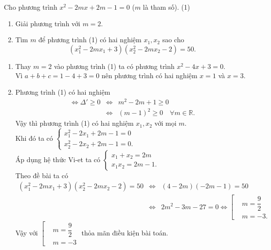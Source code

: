 \begin{ex}%
 Cho phương trình $x^2-2mx+2m-1=0$ ($m$ là tham số). \hfill (1)
	\begin{enumerate}
		\item Giải phương trình với $m=2$.
		\item Tìm $m$ để phương trình (1) có hai nghiệm $x_1, x_2$ sao cho $$\left(x_1^2-2mx_1+3\right)\left(x_2^2-2mx_2-2\right)=50.$$
	\end{enumerate}	
\loigiai
{
\begin{enumerate}
\item Thay $m=2$ vào phương trình (1) ta có phương trình $x^2-4x+3=0$.\\
Vì $ a+b+c=1-4+3=0 $ nên phương trình có hai nghiệm $ x=1 $ và $ x=3 $.
\item Phương trình (1) có hai nghiệm
\begin{eqnarray*}
\Leftrightarrow \Delta'\ge 0 &\Leftrightarrow&m^2-2m+1 \ge 0\\
 &\Leftrightarrow&(m-1)^2 \ge 0 \quad \forall m \in \mathbb{R}.
\end{eqnarray*}
Vậy thì phương trình (1) có hai nghiệm  $x_1, x_2$ với mọi $ m $.\\
Khi đó ta có $\begin{cases} x_1^2-2x_1+2m-1=0 \\ x_2^2-2x_2+2m-1=0. \end{cases}$\\
Áp dụng hệ thức Vi-et ta có $\begin{cases} x_1+x_2=2m \\ x_1x_2=2m-1. \end{cases}$\\
Theo đề bài ta có
\begin{eqnarray*}
\left(x_1^2-2mx_1+3\right)\left(x_2^2-2mx_2-2\right)=50&\Leftrightarrow&(4-2m)(-2m-1)=50\\
&\Leftrightarrow& 2m^2-3m-27=0 \Leftrightarrow \left[\begin{aligned}&m=\dfrac{9}{2}\\&m=-3. \end{aligned}\right.
\end{eqnarray*}
Vậy với $\left[\begin{aligned}&m=\dfrac{9}{2}\\&m=-3 \end{aligned} \right.$ thỏa mãn điều kiện bài toán.
\end{enumerate}
}
\end{ex}




